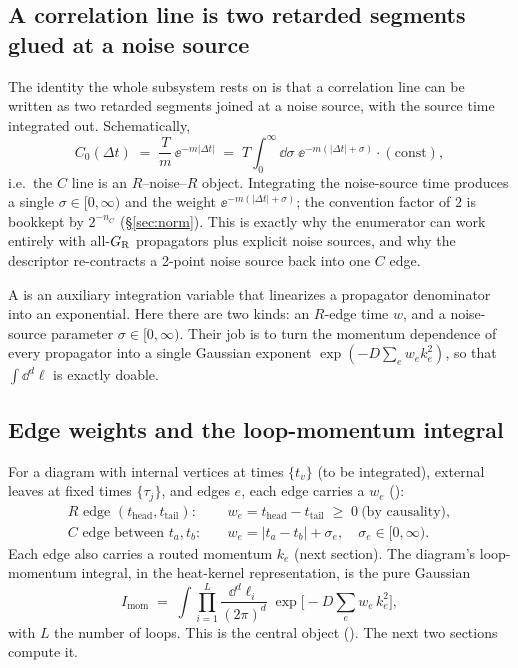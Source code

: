 \subsection{A correlation line is two retarded segments glued at a noise source}

The identity the whole subsystem rests on is that a correlation line can be
written as two retarded segments joined at a noise source, with the source time
integrated out. Schematically,
\begin{equation}
  C_0(\Delta t) \;=\; \frac{T}{m}\,\ee^{-m|\Delta t|}
  \;=\; T\!\int_0^{\infty}\!\dd\sigma\;\ee^{-m(|\Delta t|+\sigma)}\cdot(\text{const}),
  \label{eq:Cglue}
\end{equation}
i.e.\ the $C$ line is an $R$--noise--$R$ object. Integrating the noise-source
time produces a single  $\sigma\in[0,\infty)$ and the
weight $\ee^{-m(|\Delta t|+\sigma)}$; the convention factor of $2$ is bookkept by
$2^{-n_C}$ (\S\ref{sec:norm}). This is exactly why the enumerator can work
entirely with all-$G_{\mathrm R}$ propagators plus explicit noise sources, and why the
descriptor re-contracts a 2-point noise source back into one $C$ edge.

\begin{defn}
A  is an auxiliary integration variable that linearizes
a propagator denominator into an exponential. Here there are two kinds: an
$R$-edge time $w$, and a noise-source parameter $\sigma\in[0,\infty)$. Their job
is to turn the momentum dependence of every propagator into a single Gaussian
exponent $\exp(-D\sum_e w_e k_e^2)$, so that $\int\dd^d\ell$ is exactly doable.
\end{defn}

\subsection{Edge weights and the loop-momentum integral}

For a diagram with internal vertices at times $\{t_v\}$ (to be integrated),
external leaves at fixed times $\{\tau_j\}$, and edges $e$, each edge carries a
 $w_e$ ():
\begin{align}
  R \text{ edge } (t_{\text{head}},t_{\text{tail}}):&\quad
     w_e = t_{\text{head}} - t_{\text{tail}} \;\ge\; 0 \ \text{(by causality)},\\
  C \text{ edge between } t_a,t_b:&\quad
     w_e = |t_a - t_b| + \sigma_e,\quad \sigma_e\in[0,\infty).
\end{align}
Each edge also carries a routed momentum $k_e$ (next section). The diagram's
loop-momentum integral, in the heat-kernel representation, is the pure Gaussian
\begin{equation}
  I_{\text{mom}} \;=\; \int \prod_{i=1}^{L}\frac{\dd^d\ell_i}{(2\pi)^d}\;
     \exp\!\Big[-D\sum_e w_e\,k_e^2\Big],
  \label{eq:Imom}
\end{equation}
with $L$ the number of loops. This is the central object
(). The next two sections compute it.

